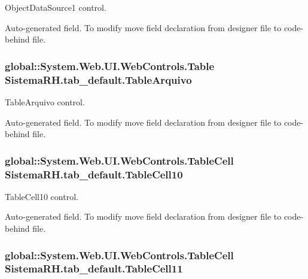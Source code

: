 ObjectDataSource1 control. 

Auto-\/generated field. To modify move field declaration from designer file to code-\/behind file. \hypertarget{class_sistema_r_h_1_1tab__default_a644d387b1dacfff7e019013eb3f9e5fb}{
\subsubsection[{TableArquivo}]{\setlength{\rightskip}{0pt plus 5cm}global::System.Web.UI.WebControls.Table {\bf SistemaRH.tab\_\-default.TableArquivo}}}
\label{class_sistema_r_h_1_1tab__default_a644d387b1dacfff7e019013eb3f9e5fb}


TableArquivo control. 

Auto-\/generated field. To modify move field declaration from designer file to code-\/behind file. \hypertarget{class_sistema_r_h_1_1tab__default_a134d4af0391d97f909a183ec253058d3}{
\subsubsection[{TableCell10}]{\setlength{\rightskip}{0pt plus 5cm}global::System.Web.UI.WebControls.TableCell {\bf SistemaRH.tab\_\-default.TableCell10}}}
\label{class_sistema_r_h_1_1tab__default_a134d4af0391d97f909a183ec253058d3}


TableCell10 control. 

Auto-\/generated field. To modify move field declaration from designer file to code-\/behind file. \hypertarget{class_sistema_r_h_1_1tab__default_a28bbf96948ee761dda20f4529b4fe0ba}{
\subsubsection[{TableCell11}]{\setlength{\rightskip}{0pt plus 5cm}global::System.Web.UI.WebControls.TableCell {\bf SistemaRH.tab\_\-default.TableCell11}}}
\label{class_sistema_r_h_1_1tab__default_a28bbf96948ee761dda20f4529b4fe0ba}


